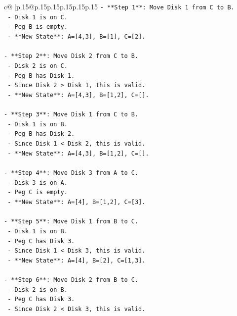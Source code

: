\documentclass{article}
\begin{document}
{\begin{supertabular}{c@{$\;$}|p{.15\linewidth}@{}p{.15\linewidth}p{.15\linewidth}p{.15\linewidth}p{.15\linewidth}p{.15\linewidth}}
{{{\texttt{{-} **Step 1**: Move Disk 1 from C to B.} \\
\texttt{  {-} Disk 1 is on C.} \\
\texttt{  {-} Peg B is empty.} \\
\texttt{  {-} **New State**: A={[}4,3{]}, B={[}1{]}, C={[}2{]}.} \\
\\ 
\texttt{{-} **Step 2**: Move Disk 2 from C to B.} \\
\texttt{  {-} Disk 2 is on C.} \\
\texttt{  {-} Peg B has Disk 1.} \\
\texttt{  {-} Since Disk 2 > Disk 1, this is valid.} \\
\texttt{  {-} **New State**: A={[}4,3{]}, B={[}1,2{]}, C={[}{]}.} \\
\\ 
\texttt{{-} **Step 3**: Move Disk 1 from C to B.} \\
\texttt{  {-} Disk 1 is on B.} \\
\texttt{  {-} Peg B has Disk 2.} \\
\texttt{  {-} Since Disk 1 < Disk 2, this is valid.} \\
\texttt{  {-} **New State**: A={[}4,3{]}, B={[}1,2{]}, C={[}{]}.} \\
\\ 
\texttt{{-} **Step 4**: Move Disk 3 from A to C.} \\
\texttt{  {-} Disk 3 is on A.} \\
\texttt{  {-} Peg C is empty.} \\
\texttt{  {-} **New State**: A={[}4{]}, B={[}1,2{]}, C={[}3{]}.} \\
\\ 
\texttt{{-} **Step 5**: Move Disk 1 from B to C.} \\
\texttt{  {-} Disk 1 is on B.} \\
\texttt{  {-} Peg C has Disk 3.} \\
\texttt{  {-} Since Disk 1 < Disk 3, this is valid.} \\
\texttt{  {-} **New State**: A={[}4{]}, B={[}2{]}, C={[}1,3{]}.} \\
\\ 
\texttt{{-} **Step 6**: Move Disk 2 from B to C.} \\
\texttt{  {-} Disk 2 is on B.} \\
\texttt{  {-} Peg C has Disk 3.} \\
\texttt{  {-} Since Disk 2 < Disk 3, this is valid.} \\
}}}
\end{supertabular}}
\end{document}
